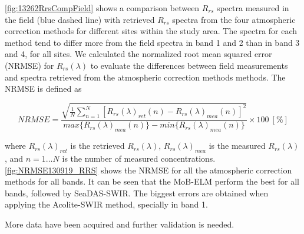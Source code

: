 \documentclass[draft]{spie}  %
\begin{document}
\autoref{fig:13262RrsCompField} shows a comparison between $R_{rs}$ spectra measured in the field (blue dashed line) with retrieved $R_{rs}$ spectra from the four atmospheric correction methods for different sites within the study area. The spectra for each method tend to differ more from the field spectra in band 1 and 2 than in band 3 and 4, for all sites. We calculated the normalized root mean squared error (NRMSE) for $R_{rs}(\lambda)$ to evaluate the differences between field measurements and spectra retrieved from the atmospheric correction methods methods. The NRMSE is defined as

\begin{equation}
\label{eq:NRMSE}
	NRMSE =\frac{\sqrt{\frac{1}{N}\sum_{n=1}^N{\left[R_{rs}(\lambda)_{ret}(n) - R_{rs}(\lambda)_{mea}(n)\right]^2}}}{max\{R_{rs}(\lambda)_{mea}(n)\} - min\{R_{rs}(\lambda)_{mea}(n)\}}\times100 ~[\%]
\end{equation}

\noindent where $R_{rs}(\lambda)_{ret}$ is the retrieved $R_{rs}(\lambda)$, $R_{rs}(\lambda)_{mea}$ is the measured $R_{rs}(\lambda)$, and $n=1\dots N$ is the number of measured concentrations. \autoref{fig:NRMSE130919_RRS} shows the NRMSE for all the atmospheric correction methods for all bands. It can be seen that the MoB-ELM perform the best for all bands, followed by SeaDAS-SWIR. The biggest errors are obtained when applying the Acolite-SWIR method, specially in band 1.

More data have been acquired and further validation is needed.

\end{document}
